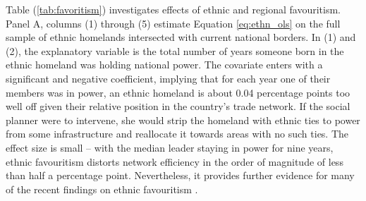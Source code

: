 \documentclass[11pt, oneside]{article}   	%
\let\oldref\ref
\renewcommand{\ref}[1]{(\oldref{#1})}
\begin{document}
Table \ref{tab:favoritism} investigates effects of ethnic and regional favouritism. Panel A, columns (1) through (5) estimate Equation \eqref{eq:ethn_ols} on the full sample of ethnic homelands intersected with current national borders. In (1) and (2), the explanatory variable is the total number of years someone born in the ethnic homeland was holding national power. The covariate enters with a significant and negative coefficient, implying that for each year one of their members was in power, an ethnic homeland is about 0.04 percentage points too well off given their relative position in the country's trade network. If the social planner were to intervene, she would strip the homeland with ethnic ties to power from some infrastructure and reallocate it towards areas with no such ties. The effect size is small -- with the median leader staying in power for nine years, ethnic favouritism distorts network efficiency in the order of magnitude of less than half a percentage point. Nevertheless, it provides further evidence for many of the recent findings on ethnic favouritism \citep{DeLuca_Ethnicfavoritismaxiom_2018}.
\end{document}
